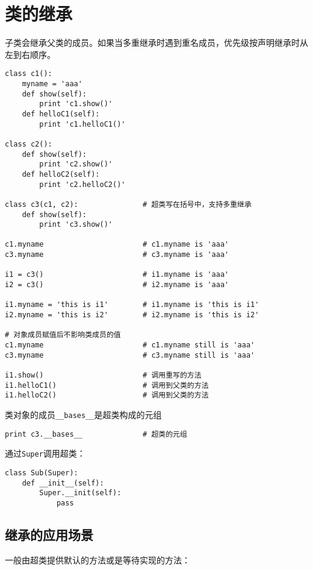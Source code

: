 \section{类的继承}

子类会继承父类的成员。如果当多重继承时遇到重名成员，优先级按声明继承时从左到右顺序。

\begin{lstlisting}
class c1():
	myname = 'aaa'
	def show(self):
		print 'c1.show()'
	def helloC1(self):
		print 'c1.helloC1()'

class c2():
	def show(self):
		print 'c2.show()'
	def helloC2(self):
		print 'c2.helloC2()'

class c3(c1, c2):               # 超类写在括号中，支持多重继承
	def show(self):
		print 'c3.show()'

c1.myname                       # c1.myname is 'aaa'
c3.myname                       # c3.myname is 'aaa'

i1 = c3()                       # i1.myname is 'aaa'
i2 = c3()                       # i2.myname is 'aaa'

i1.myname = 'this is i1'        # i1.myname is 'this is i1'
i2.myname = 'this is i2'        # i2.myname is 'this is i2'

# 对象成员赋值后不影响类成员的值
c1.myname                       # c1.myname still is 'aaa'
c3.myname                       # c3.myname still is 'aaa'

i1.show()                       # 调用重写的方法
i1.helloC1()                    # 调用到父类的方法
i1.helloC2()                    # 调用到父类的方法
\end{lstlisting}

类对象的成员\verb|__bases__|是超类构成的元组

\begin{lstlisting}
print c3.__bases__              # 超类的元组
\end{lstlisting}

通过\verb|Super|调用超类：

\begin{lstlisting}
class Sub(Super):
	def __init__(self):
		Super.__init(self):
			pass
\end{lstlisting}

\subsection{继承的应用场景}

一般由超类提供默认的方法或是等待实现的方法：

